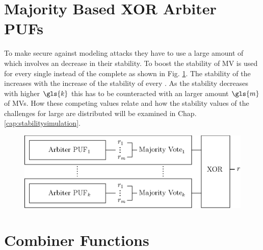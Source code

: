 
\section{Majority Based XOR Arbiter PUFs}
\label{sec:majorityxorarbiter}

To make \xpuf secure against modeling attacks they have to use a large amount of \apufs which involves an decrease in their stability.
To boost the stability of \xpufs \ac{MV} is used for every single \apuf instead of the complete \xpuf as shown in Fig. \ref{fig:majorityxorarbiter}.
The stability of the \xpuf increases with the increase of the stability of every \mpuf.
As the stability decreases with higher $\gls{k}$ this has to be counteracted with an larger amount $\gls{m}$ of \acp{MV}.
How these competing values relate and how the stability values of the challenges for large \mxpufs are distributed will be examined in Chap. \ref{cap:stabilitysimulation}.

\begin{figure}[ht]
\centering
\includegraphics[width=1.00\textwidth]{images/majority_xor_arbiter_v2.eps}
\caption[Majority \acs{XOR} \apuf]{\mxpuf}
\label{fig:majorityxorarbiter}
\end{figure}


\section{Combiner Functions}
\label{sec:combinerfunctions}

